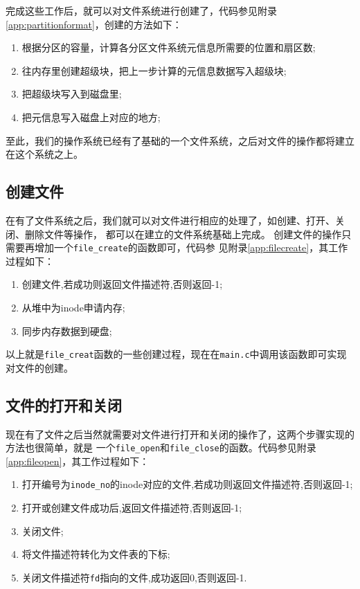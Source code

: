 完成这些工作后，就可以对文件系统\cite{zsn2022}进行创建了，代码参见附录
\ref{app:partitionformat}，创建的方法如下：
\begin{enumerate}
\item 根据分区的容量，计算各分区文件系统元信息所需要的位置和扇区数;
\item 往内存里创建超级块，把上一步计算的元信息数据写入超级块;
\item 把超级块写入到磁盘里;
\item 把元信息写入磁盘上对应的地方;
\end{enumerate}
至此，我们的操作系统已经有了基础的一个文件系统，之后对文件的操作都将建立在这个系统之上。

\subsection{创建文件}
在有了文件系统之后，我们就可以对文件进行相应的处理了，如创建、打开、关闭、删除文件等操作，
都可以在建立的文件系统基础上完成。
创建文件的操作只需要再增加一个\texttt{file\_create}的函数即可，代码参
见附录\ref{app:filecreate}，其工作过程如下：
\begin{enumerate}
\item 创建文件,若成功则返回文件描述符,否则返回-1;
\item 从堆中为inode申请内存;
\item 同步内存数据到硬盘;
\end{enumerate}
以上就是\texttt{file\_creat}函数的一些创建过程，现在在\texttt{main.c}中调用该函数即可实现对文件的创建。

\subsection{文件的打开和关闭}
现在有了文件之后当然就需要对文件进行打开和关闭的操作了，这两个步骤实现的方法也很简单，就是
一个\texttt{file\_open}和\texttt{file\_close}的函数。代码参见附录
\ref{app:fileopen}，其工作过程如下：
\begin{enumerate}
\item 打开编号为\texttt{inode\_no}的inode对应的文件,若成功则返回文件描述符,否则返回-1;
\item 打开或创建文件成功后,返回文件描述符,否则返回-1;
\item 关闭文件;
\item 将文件描述符转化为文件表的下标;
\item 关闭文件描述符\texttt{fd}指向的文件,成功返回0,否则返回-1.
\end{enumerate}

